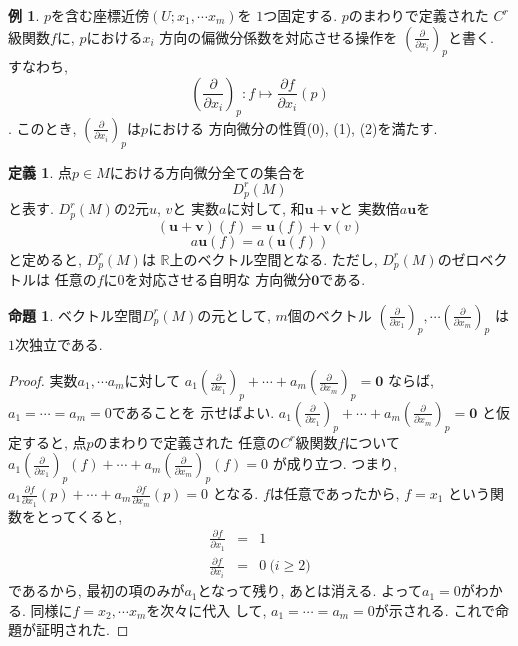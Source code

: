 \documentclass[a4j,12pt]{jarticle}
\theoremstyle{definition}
\newtheorem{definition}[theorem]{定義}
\newtheorem{proposition}[theorem]{命題}
\newtheorem{example}[theorem]{例}
\begin{document}
    \begin{example}
        $p$を含む座標近傍$(U;x_1,\cdots x_m)$を
        $1$つ固定する. $p$のまわりで定義された
        $C^r$級関数$f$に, $p$における$x_i$
        方向の偏微分係数を対応させる操作を
        $\left(\frac{\partial}{\partial x_i}
        \right)_p$と書く. すなわち, 
        $$\left(\frac{\partial}{\partial x_i}
        \right)_p:f\mapsto 
        \frac{\partial f}{\partial x_i}(p)$$. 
        このとき, $\left(\frac{\partial}
        {\partial x_i}\right)_p$は$p$における
        方向微分の性質(0), (1), (2)を満たす. 
    \end{example}
    \begin{definition}
        点$p\in M$における方向微分全ての集合を
        $$D_p^r(M)$$
        と表す. $D_p^r(M)$の$2$元$u$, $v$と
        実数$a$に対して, 
        和$\boldsymbol{u}+\boldsymbol{v}$と
        実数倍$a\boldsymbol{u}$を
        $$(\boldsymbol{u}+\boldsymbol{v})(f)=
        \boldsymbol{u}(f)+\boldsymbol{v}(v)$$
        $$a\boldsymbol{u}(f)=
        a(\boldsymbol{u}(f))$$
        と定めると, $D_p^r(M)$は
        $\mathbb{R}$上のベクトル空間となる. 
        ただし, $D_p^r(M)$のゼロベクトルは
        任意の$f$に$0$を対応させる自明な
        方向微分$\boldsymbol{0}$である. 
    \end{definition}
    \begin{proposition}
        ベクトル空間$D_p^r(M)$の元として, 
        $m$個のベクトル
        $\left(\frac{\partial}{\partial x_1}\right)_p, 
        \cdots 
        \left(\frac{\partial}{\partial x_m}\right)_p$
        は$1$次独立である. 
    \end{proposition}
    \begin{proof}
        実数$a_1,\cdots a_m$に対して
        $a_1\left(\frac{\partial}{\partial x_1}\right)_p+
        \cdots +
        a_m\left(\frac{\partial}{\partial x_m}\right)_p=
        \boldsymbol{0}$
        ならば, $a_1=\cdots =a_m=0$であることを
        示せばよい. 
        $a_1\left(\frac{\partial}{\partial x_1}\right)_p+
        \cdots +
        a_m\left(\frac{\partial}{\partial x_m}\right)_p=
        \boldsymbol{0}$
        と仮定すると, 点$p$のまわりで定義された
        任意の$C^r$級関数$f$について
        $a_1\left(\frac{\partial}{\partial x_1}\right)_p(f)+
        \cdots +
        a_m\left(\frac{\partial}{\partial x_m}\right)_p(f)=
        0$
        が成り立つ. つまり, 
        $a_1\frac{\partial f}{\partial x_1}(p)+
        \cdots +
        a_m\frac{\partial f}{\partial x_m}(p)=
        0$
        となる. $f$は任意であったから, $f=x_1$
        という関数をとってくると, 
        \begin{eqnarray*}
            \frac{\partial f}{\partial x_1}&=&1\\
            \frac{\partial f}{\partial x_i}&=&0
            \ \text{($i\geq 2$)}
        \end{eqnarray*}
        であるから, 最初の項のみが$a_1$となって残り, 
        あとは消える. よって$a_1=0$がわかる. 
        同様に$f=x_2,\cdots x_m$を次々に代入
        して, $a_1=\cdots =a_m=0$が示される. 
        これで命題が証明された. 
    \end{proof}
\end{document}
